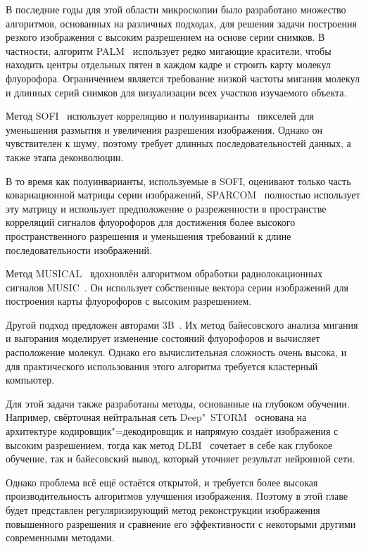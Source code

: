 В последние годы для этой области микроскопии было разработано множество алгоритмов, основанных на различных подходах, для решения задачи построения резкого изображения с высоким разрешением на основе серии снимков. В частности, алгоритм PALM~\cite{betzig2006imaging} использует редко мигающие красители, чтобы находить центры отдельных пятен в каждом кадре и строить карту молекул флуорофора. Ограничением является требование низкой частоты мигания молекул и длинных серий снимков для визуализации всех участков изучаемого объекта.

Метод SOFI~\cite{dertinger2009fast, dertinger2010achieving} использует корреляцию и полуинварианты~\cite{75086} пикселей для уменьшения размытия и увеличения разрешения изображения. Однако он чувствителен к шуму, поэтому требует длинных последовательностей данных, а также этапа деконволюции.

В то время как полуинварианты, используемые в SOFI, оценивают только часть ковариационной матрицы серии изображений, SPARCOM~\cite{Solomon:18} полностью использует эту матрицу и использует предположение о разреженности в пространстве корреляций сигналов флуорофоров для достижения более высокого пространственного разрешения и уменьшения требований к длине последовательности изображений.

Метод MUSICAL~\cite{agarwal2016multiple} вдохновлён алгоритмом обработки радиолокационных сигналов MUSIC~\cite{schmidt1986multiple}. Он использует собственные вектора серии изображений для построения карты флуорофоров с высоким разрешением.

Другой подход предложен авторами 3B~\cite{cox2012bayesian}. Их метод байесовского анализа мигания и выгорания моделирует изменение состояний флуорофоров и вычисляет расположение молекул. Однако его вычислительная сложность очень высока, и для практического использования этого алгоритма требуется кластерный компьютер.

Для этой задачи также разработаны методы, основанные на глубоком обучении. Например, свёрточная нейтральная сеть Deep"~STORM~\cite{Nehme:18} основана на архитектуре кодировщик"=декодировщик и напрямую создаёт изображения с высоким разрешением, тогда как метод DLBI~\cite{10.1093/bioinformatics/bty241} сочетает в себе как глубокое обучение, так и байесовский вывод, который уточняет результат нейронной сети. 

Однако проблема всё ещё остаётся открытой, и требуется более высокая производительность алгоритмов улучшения изображения. Поэтому в этой главе будет представлен регуляризирующий метод реконструкции изображения повышенного разрешения и сравнение его эффективности с некоторыми другими современными методами.

